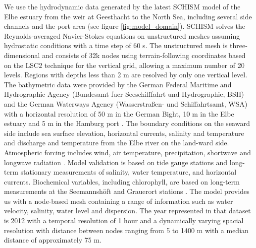 \documentclass[npg, manuscript]{copernicus}
\begin{document}
We use the hydrodynamic data generated by the latest SCHISM model of the Elbe estuary \citep{Pein2021} from the weir at Geesthacht to the North Sea, including several side channels and the port area (see figure \ref{fig:model_domain}).
SCHISM solves the Reynolds-averaged Navier-Stokes equations on unstructured meshes assuming hydrostatic conditions with a time step of 60 \unit{s}.
The unstructured mesh is three-dimensional and consists of 32k nodes using terrain-following coordinates based on the LSC2 technique \citep{Zhang2016} for the vertical grid, allowing a maximum number of 20 levels.
Regions with depths less than 2 \unit{m} are resolved by only one vertical level.
The bathymetric data were provided by the German Federal Maritime and Hydrographic Agency (Bundesamt fuer Seeschifffahrt und Hydrographie, BSH) and the German Waterways Agency (Wasserstraßen- und Schiffahrtsamt, WSA) with a horizontal resolution of 50 m in the German Bight, 10 m in the Elbe estuary and 5 m in the Hamburg port \cite{Stanev2019}.
The boundary conditions on the seaward side include sea surface elevation, horizontal currents, salinity and temperature \cite{Stanev2019} and discharge and temperature from the Elbe river on the land-ward side.
Atmospheric forcing includes wind, air temperature, precipitation, shortwave and longwave radiation \cite{Stanev2019}.
Model validation is based on tide gauge stations and long-term stationary measurements of salinity, water temperature, and horizontal currents.
Biochemical variables, including chlorophyll, are based on long-term measurements at the Seemannshöft and Grauerort stations \cite{Pein2021}.
The model provides us with a node-based mesh containing a range of information such as water velocity, salinity, water level and dispersion.
The year represented in that dataset is 2012 with a temporal resolution of 1 hour and a dynamically varying spacial resolution with distance between nodes ranging from 5 to 1400 \unit{m} with a median distance of approximately 75 \unit{m}.
\end{document}
